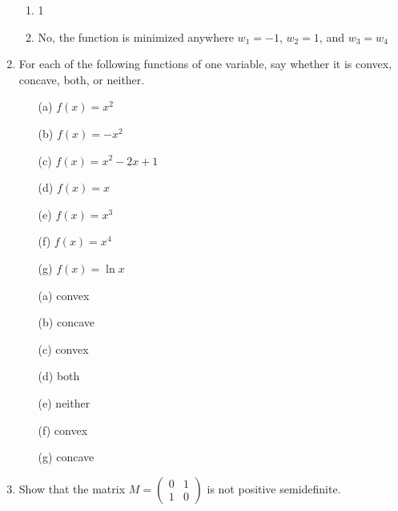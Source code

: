 \documentclass[10pt]{report}
\begin{document}
\begin{enumerate}
\begin{solution}
\begin{enumerate}
    \item 
      1
    \item 
      No, the function is minimized anywhere $w_1 = -1$, $w_2 = 1$, and $w_3 = w_4$
  \end{enumerate}
\end{solution}

\item For each of the following functions of one variable, say whether it is convex, concave, both, or neither.
\begin{enumerate}
\item[(a)] $f(x) = x^2$
\item[(b)] $f(x) = -x^2$

\item[(c)] $f(x) = x^2 - 2x + 1$

\item[(d)] $f(x) = x$

\item[(e)] $f(x) = x^3$

\item[(f)] $f(x) = x^4$

\item[(g)] $f(x) = \ln x$

\end{enumerate}
\begin{solution}
  \begin{enumerate}
    \item[(a)]
      convex
    \item[(b)]
      concave
    \item[(c)]
      convex
    \item[(d)]
      both
    \item[(e)]
      neither
    \item[(f)]
      convex
    \item[(g)]
      concave
  \end{enumerate}
\end{solution}

\item Show that the matrix $M = \begin{pmatrix} 0 & 1 \\ 1 & 0 \end{pmatrix}$ is not positive semidefinite.
\begin{solution}


\end{solution}
\end{enumerate}
\end{document}
